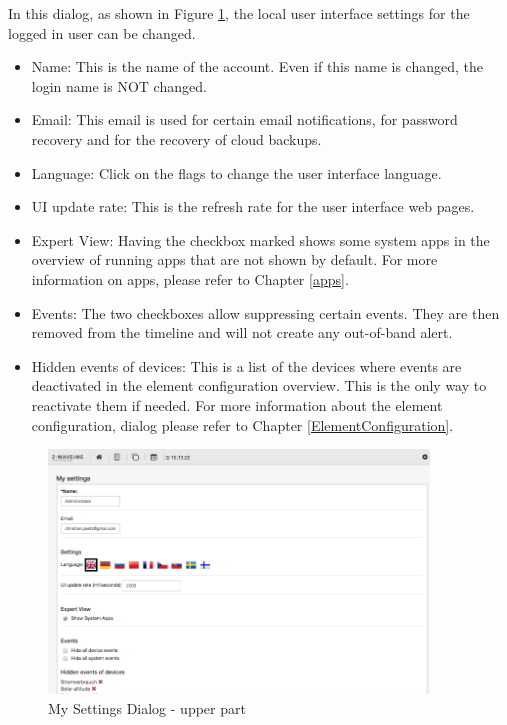 In this dialog, as shown in Figure \ref{device4}, the local user interface settings for 
the logged in user can be changed.

\begin{itemize}
\item Name: This is the name of the account. Even if this name is changed, the login name is NOT changed.
\item Email: This email is used for certain email notifications, for password recovery and for the recovery of cloud backups.
\item Language: Click on the flags to change the user interface language.
\item UI update rate: This is the refresh rate for the user interface web pages.
\item Expert View: Having the checkbox marked shows some system apps in the overview of 
running apps that are not shown by default. For more information on apps, please refer 
to Chapter \ref{apps}.
\item Events: The two checkboxes allow suppressing certain events. They are then removed 
from the timeline and will not create any out-of-band alert.
\item Hidden events of devices:  This 
is a list of the devices where events are deactivated in the element configuration overview. 
This is the only way to reactivate them if needed. For more information about the element 
configuration, dialog please refer to Chapter \ref{ElementConfiguration}.
\end{itemize}

\begin{figure}
\begin{center}
\includegraphics[width=0.9\textwidth]{pngs/cap4/device4.png}
\caption{My Settings Dialog - upper part}
\label{device4}
\end{center}
\end{figure}

